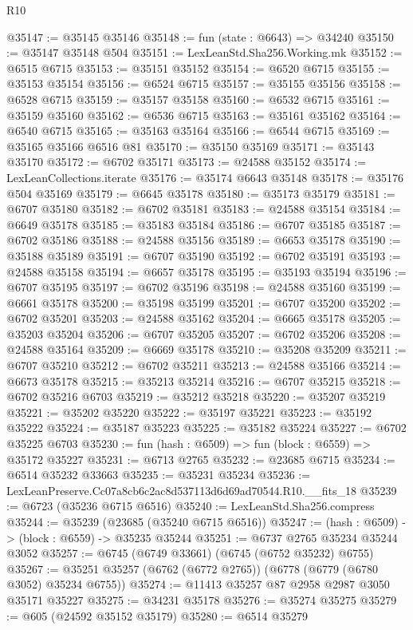 \begin{lexlean}{R10}
\begin{coremodule}
@35147 := @35145 @35146
@35148 := fun (state : @6643) => @34240
@35150 := @35147 @35148 @504
@35151 := LexLeanStd.Sha256.Working.mk
@35152 := @6515 @6715
@35153 := @35151 @35152
@35154 := @6520 @6715
@35155 := @35153 @35154
@35156 := @6524 @6715
@35157 := @35155 @35156
@35158 := @6528 @6715
@35159 := @35157 @35158
@35160 := @6532 @6715
@35161 := @35159 @35160
@35162 := @6536 @6715
@35163 := @35161 @35162
@35164 := @6540 @6715
@35165 := @35163 @35164
@35166 := @6544 @6715
@35169 := @35165 @35166 @6516 @81
@35170 := @35150 @35169
@35171 := @35143 @35170
@35172 := @6702 @35171
@35173 := @24588 @35152
@35174 := LexLeanCollections.iterate
@35176 := @35174 @6643 @35148
@35178 := @35176 @504 @35169
@35179 := @6645 @35178
@35180 := @35173 @35179
@35181 := @6707 @35180
@35182 := @6702 @35181
@35183 := @24588 @35154
@35184 := @6649 @35178
@35185 := @35183 @35184
@35186 := @6707 @35185
@35187 := @6702 @35186
@35188 := @24588 @35156
@35189 := @6653 @35178
@35190 := @35188 @35189
@35191 := @6707 @35190
@35192 := @6702 @35191
@35193 := @24588 @35158
@35194 := @6657 @35178
@35195 := @35193 @35194
@35196 := @6707 @35195
@35197 := @6702 @35196
@35198 := @24588 @35160
@35199 := @6661 @35178
@35200 := @35198 @35199
@35201 := @6707 @35200
@35202 := @6702 @35201
@35203 := @24588 @35162
@35204 := @6665 @35178
@35205 := @35203 @35204
@35206 := @6707 @35205
@35207 := @6702 @35206
@35208 := @24588 @35164
@35209 := @6669 @35178
@35210 := @35208 @35209
@35211 := @6707 @35210
@35212 := @6702 @35211
@35213 := @24588 @35166
@35214 := @6673 @35178
@35215 := @35213 @35214
@35216 := @6707 @35215
@35218 := @6702 @35216 @6703
@35219 := @35212 @35218
@35220 := @35207 @35219
@35221 := @35202 @35220
@35222 := @35197 @35221
@35223 := @35192 @35222
@35224 := @35187 @35223
@35225 := @35182 @35224
@35227 := @6702 @35225 @6703
@35230 := fun (hash : @6509) => fun (block : @6559) => @35172 @35227
@35231 := @6713 @2765
@35232 := @23685 @6715
@35234 := @6514 @35232 @33663
@35235 := @35231 @35234
@35236 := LexLeanPreserve.Cc07a8cb6c2ac8d537113d6d69ad70544.R10.__fits_18
@35239 := @6723 (@35236 @6715 @6516)
@35240 := LexLeanStd.Sha256.compress
@35244 := @35239 (@23685 (@35240 @6715 @6516))
@35247 := (hash : @6509) -> (block : @6559) -> @35235 @35244
@35251 := @6737 @2765 @35234 @35244 @3052
@35257 := @6745 (@6749 @33661) (@6745 (@6752 @35232) @6755)
@35267 := @35251 @35257 (@6762 (@6772 @2765)) (@6778 (@6779 (@6780 @3052) @35234 @6755))
@35274 := @11413 @35257 @87 @2958 @2987 @3050 @35171 @35227
@35275 := @34231 @35178
@35276 := @35274 @35275
@35279 := @605 (@24592 @35152 @35179)
@35280 := @6514 @35279

\end{coremodule}
\end{lexlean}
